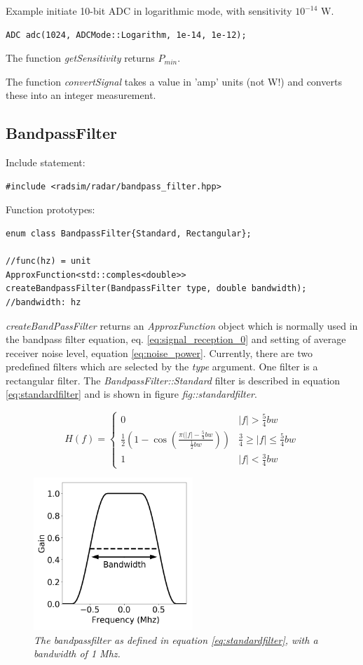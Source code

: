 \documentclass[letterpaper]{book}
\begin{document}
Example initiate 10-bit ADC in logarithmic mode, with sensitivity \(10^{-14}\) W. 
\begin{lstlisting}
ADC adc(1024, ADCMode::Logarithm, 1e-14, 1e-12);
\end{lstlisting}

The function \textit{getSensitivity} returns \(P_{min}\). 

The function \textit{convertSignal} takes a value in 'amp' units (not W!) and converts these into an integer measurement.

\subsection{BandpassFilter}
Include statement:
\begin{lstlisting}
#include <radsim/radar/bandpass_filter.hpp>
\end{lstlisting}
Function prototypes:
\begin{lstlisting}
enum class BandpassFilter{Standard, Rectangular};

//func(hz) = unit
ApproxFunction<std::comples<double>> 
createBandpassFilter(BandpassFilter type, double bandwidth);
//bandwidth: hz
\end{lstlisting}
\textit{createBandPassFilter} returns an \textit{ApproxFunction} object which is normally used in the bandpass filter equation, eq. \ref{eq:signal_reception_0} and setting of average receiver noise level, equation \ref{eq:noise_power}. Currently, there are two predefined filters which are selected by the \textit{type} argument. One filter is a rectangular filter. The \textit{BandpassFilter::Standard} filter is described in equation \ref{eq:standardfilter} and is shown in figure \textit{fig::standardfilter}. 

\begin{equation} \label{eq:standardfilter}
H(f) = \begin{cases} 
          0 & |f| > \frac{5}{4}bw \\
          \frac{1}{2}{(1-\cos{ ( \frac{\pi(|f|-\frac{5}{4}bw}{\frac{1}{2}bw} ) })} & \frac{3}{4} \geq |f| \leq \frac{5}{4}bw \\
          1 & |f| < \frac{3}{4}bw 
       \end{cases}
\end{equation}
\begin{figure}
  \includegraphics[width=6cm]{BandPassFilter.png}
  \caption{\textit{The bandpassfilter as defined in equation \ref{eq:standardfilter}, with a bandwidth of 1 Mhz.}}
  \label{fig:standardfilter}
\end{figure}
\end{document}
